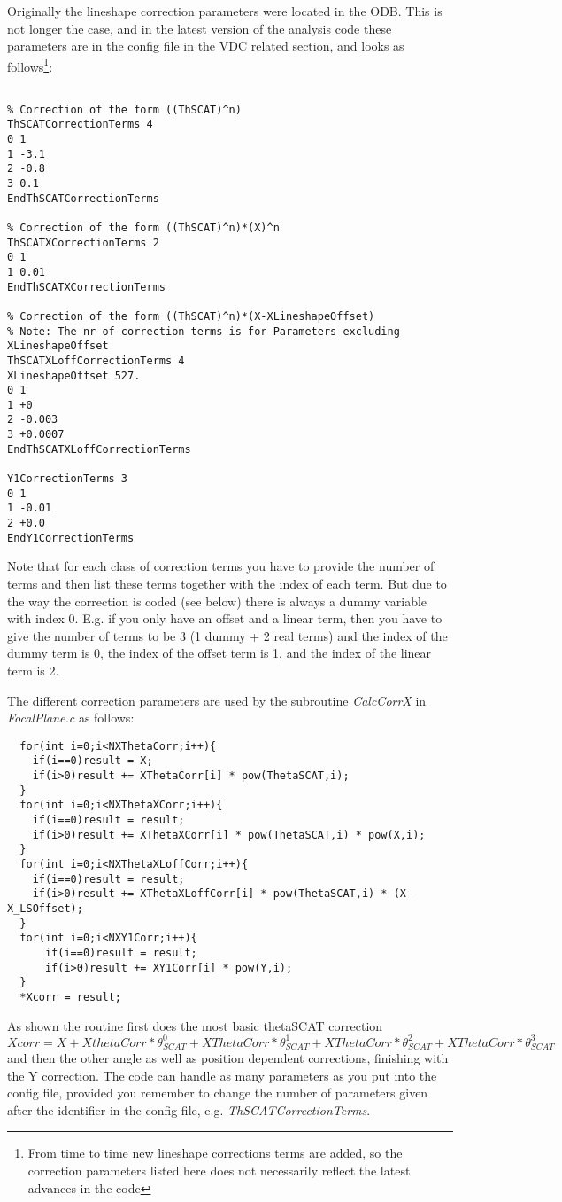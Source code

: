 \documentclass[11pt]{report}
\begin{document}
\begin{enumerate}
Originally the lineshape correction parameters were located in the ODB. 
This is not longer the case, and 
in the latest version of the analysis code
these parameters are in the config file in the VDC related section, and looks as follows\footnote{From time to time
new lineshape corrections terms are added, so the correction parameters listed here does not necessarily
reflect the latest advances in the code}:
\begin{verbatim} 

% Correction of the form ((ThSCAT)^n)
ThSCATCorrectionTerms 4
0 1
1 -3.1
2 -0.8
3 0.1
EndThSCATCorrectionTerms

% Correction of the form ((ThSCAT)^n)*(X)^n
ThSCATXCorrectionTerms 2
0 1
1 0.01
EndThSCATXCorrectionTerms

% Correction of the form ((ThSCAT)^n)*(X-XLineshapeOffset)
% Note: The nr of correction terms is for Parameters excluding XLineshapeOffset
ThSCATXLoffCorrectionTerms 4
XLineshapeOffset 527.
0 1
1 +0
2 -0.003
3 +0.0007
EndThSCATXLoffCorrectionTerms

Y1CorrectionTerms 3
0 1
1 -0.01
2 +0.0
EndY1CorrectionTerms

\end{verbatim} 

Note that for each class of correction terms you have to provide the number of terms and then
list these terms together with the index of each term. But due to the way the correction is coded
(see below) there is always a dummy variable with index 0. E.g. if you only have an offset and 
a linear term, then you have to give the number of terms to be 3 (1 dummy + 2 real terms)
and the index of the dummy term is 0, the index of the offset term is 1, and the index of the 
linear term is 2.

The different correction parameters are used by the subroutine {\it CalcCorrX} in 
{\it FocalPlane.c} as follows: 
\begin{verbatim} 
  for(int i=0;i<NXThetaCorr;i++){
    if(i==0)result = X;
    if(i>0)result += XThetaCorr[i] * pow(ThetaSCAT,i);
  }
  for(int i=0;i<NXThetaXCorr;i++){
    if(i==0)result = result;
    if(i>0)result += XThetaXCorr[i] * pow(ThetaSCAT,i) * pow(X,i);
  }
  for(int i=0;i<NXThetaXLoffCorr;i++){
    if(i==0)result = result;
    if(i>0)result += XThetaXLoffCorr[i] * pow(ThetaSCAT,i) * (X-X_LSOffset);
  }
  for(int i=0;i<NXY1Corr;i++){
      if(i==0)result = result;
      if(i>0)result += XY1Corr[i] * pow(Y,i);
  }
  *Xcorr = result;
\end{verbatim}
As shown the routine first does the most basic thetaSCAT correction 
\begin{equation}
Xcorr = X + XthetaCorr*\theta_{SCAT}^{0} + XThetaCorr*\theta_{SCAT}^1 + XThetaCorr*\theta_{SCAT}^2  + XThetaCorr*\theta_{SCAT}^3
\end{equation}
 and then the other angle as well as position dependent corrections, finishing with the Y correction. 
The code can handle as many parameters as you put into the config file, provided you
remember to change the number of parameters given after the identifier in the config file, 
e.g. {\it ThSCATCorrectionTerms}.


\end{enumerate}
\end{document}
